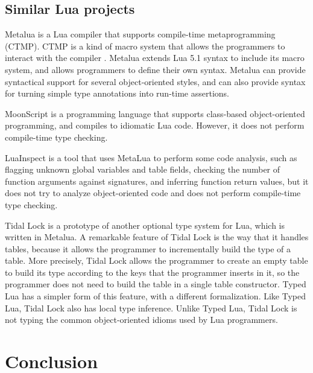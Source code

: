 \documentclass[preprint]{sig-alternate}
\begin{document}
\subsection{Similar Lua projects}

Metalua \citep{metalua} is a Lua compiler that supports compile-time
metaprogramming (CTMP).
CTMP is a kind of macro system that allows the programmers to interact
with the compiler \citep{fleutot2007contrasting}. 
Metalua extends Lua 5.1 syntax to include its macro system,
and allows programmers to define their own syntax.
Metalua can provide syntactical support for several object-oriented
styles, and can also provide syntax for turning simple type
annotations into run-time assertions.

MoonScript \citep{moonscript} is a programming language that supports
class-based object-oriented programming, and compiles to idiomatic
Lua code.
However, it does not perform compile-time type checking.

LuaInspect \citep{luainspect} is a tool that uses MetaLua to perform
some code analysis, such as flagging unknown global variables and
table fields, checking the number of function arguments against
signatures, and inferring function return values, but it does not
try to analyze object-oriented code and does not perform compile-time
type checking.

Tidal Lock \citep{tidallock} is a prototype of another optional type
system for Lua, which is written in Metalua.
A remarkable feature of Tidal Lock is the way that it handles tables,
because it allows the programmer to incrementally build the type of
a table.
More precisely, Tidal Lock allows the programmer to create an empty
table to build its type according to the keys that the programmer
inserts in it, so the programmer does not need to build the table in
a single table constructor.
Typed Lua has a simpler form of this feature, with a different
formalization.
Like Typed Lua, Tidal Lock also has local type inference.
Unlike Typed Lua, Tidal Lock is not typing the common object-oriented
idioms used by Lua programmers.

\section{Conclusion}



\end{document}
